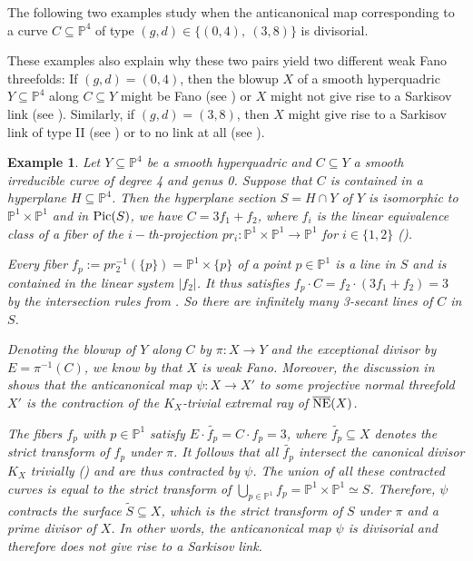 \documentclass[english,11pt,reqno]{amsart}
\newcommand{\sub}{\subseteq}
\newcommand{\Pone}{\mathbb{P}^1}
\newcommand{\Pfour}{\mathbb{P}^4}
\newcommand{\PxP}{\mathbb{P}^1 \times \mathbb{P}^1}
\newcommand{\Pic}{\textup{Pic}}
\newcommand{\NE}{\overline{\textup{NE}}}
\newtheorem{ex}[thm]{Example}
\begin{document}
The following two examples study when the anticanonical map corresponding to a curve $C\sub \Pfour$ of type $(g,d)\in \{(0,4),\:(3,8)\}$ is divisorial.\par  These examples also explain why these two pairs yield two different weak Fano threefolds: If $(g,d)=(0,4)$, then the blowup $X$ of a smooth hyperquadric $Y\sub\Pfour$ along $C\sub Y$ might be Fano (see ) or $X$ might not give rise to a Sarkisov link (see ). Similarly, if $(g,d)=(3,8)$, then $X$ might give rise to a Sarkisov link of type II (see )  or to no link at all (see ).
%
\begin{ex} \label{ex:rational_quartic_curve}
Let $Y\sub \Pfour$ be a smooth hyperquadric and $C\sub Y$ a smooth irreducible curve of degree 4 and genus 0. Suppose that $C$ is contained in a hyperplane $H\sub \Pfour$. Then the hyperplane section $S=H\cap Y$ of $Y$ is isomorphic to $\PxP$ and in $\Pic(S)$, we have $C=3f_1+f_2$, where $f_i$ is the linear equivalence class of a fiber of the $i-$th-projection $pr_i:\PxP\rightarrow \Pone$ for $i\in\{1,2\}$ ().\par 
Every fiber $f_p:=pr_2^{-1}(\{p\})=\Pone \times \{p\}$ of a point $p\in \Pone$ is a line in $S$ and is contained in the linear system $|f_2|$. It thus satisfies $f_p\cdot C=f_2\cdot(3f_1+f_2)=3$ by the intersection rules from . So there are infinitely many 3-secant lines of $C$ in $S$.\par 
Denoting the blowup of $Y$ along $C$ by $\pi:X\rightarrow Y$ and the exceptional divisor by $E=\pi^{-1}(C)$, we know by  that $X$ is weak Fano. Moreover, the discussion in  shows that the anticanonical map $\psi:X\rightarrow X'$ to some projective normal threefold $X'$ is the contraction of the $K_X$-trivial extremal ray of $\NE(X)$. \par 
The fibers $f_p$ with $p\in\Pone$ satisfy $E\cdot \widetilde{f_p}=C\cdot f_p=3$, where $\widetilde{f_p}\sub X$ denotes the strict transform of $f_p$ under $\pi$. It follows that all $\widetilde{f_p}$ intersect the canonical divisor $K_X$ trivially () and are thus contracted by $\psi$. The union of all these contracted curves is equal to the strict transform of $ \bigcup_{p\in\Pone} f_p = \PxP \simeq S $. Therefore, $\psi$ contracts the surface $\widetilde{S}\sub X$, which is the strict transform of $S$ under $\pi$ and a prime divisor of $X$.
In other words, the anticanonical map $\psi$ is divisorial and therefore does not give rise to a Sarkisov link.
\end{ex}
\end{document}
